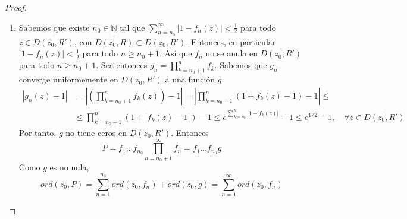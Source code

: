 \begin{proof}
\begin{enumerate}
        \item Sabemos que existe $n_0 \in \mathbb{N}$ tal que $\sum_{n=n_0}^\infty |1-f_n(z)| < \frac{1}{2}$ para todo $z \in \overline{D(z_0, R')}$, con $\overline{D(z_0, R)} \subset D(z_0, R')$.
              Entonces, en particular $|1-f_n(z)| < \frac{1}{2}$ para todo $n \geq n_0+1$.
              Así que $f_n$ no se anula en $\overline{D(z_0, R')}$ para todo $n \geq n_0+1$.
              Sea entonces $g_n = \prod_{k=n_0+1}^n f_k$.
              Sabemos que $g_n$ converge uniformemente en $\overline{D(z_0, R')}$ a una función $g$.
              \begin{align*}
                  |g_n(z)-1| & = \left|\left(\prod_{k=n_0+1}^n f_k(z)\right)-1\right| = \left|\prod_{k=n_0+1}^n (1+f_k(z)-1)-1\right| \leq                              \\
                             & \leq \prod_{k=n_0+1}^n (1+|f_k(z)-1|)-1 \leq e^{\sum_{k=n_0}^n |1-f_k(z)|} - 1 \leq e^{1/2}-1, \quad \forall z \in \overline{D(z_0, R')}
              \end{align*}
              Por tanto, $g$ no tiene ceros en $\overline{D(z_0, R')}$.
              Entonces
              $$P = f_1\dots f_{n_0}\prod_{n=n_0+1}^\infty f_n = f_1\dots f_{n_0}g$$
              Como $g$ es no nula,
              $$ord(z_0, P) = \sum_{n=1}^{n_0} ord(z_0, f_n) + ord(z_0, g) = \sum_{n=1}^\infty ord(z_0, f_n)$$


\end{enumerate}
\end{proof}
